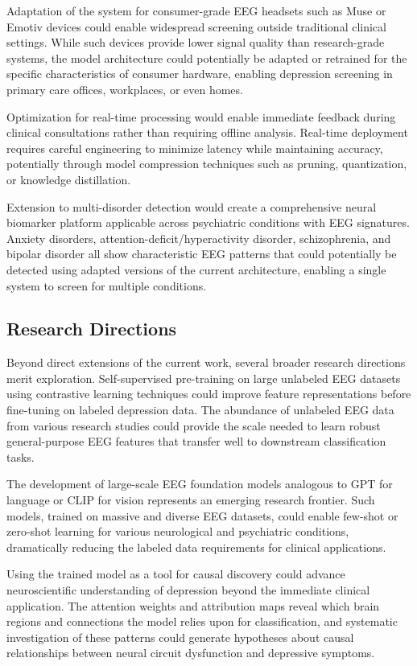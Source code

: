 Adaptation of the system for consumer-grade EEG headsets such as Muse or Emotiv devices could enable widespread screening outside traditional clinical settings. While such devices provide lower signal quality than research-grade systems, the model architecture could potentially be adapted or retrained for the specific characteristics of consumer hardware, enabling depression screening in primary care offices, workplaces, or even homes.

Optimization for real-time processing would enable immediate feedback during clinical consultations rather than requiring offline analysis. Real-time deployment requires careful engineering to minimize latency while maintaining accuracy, potentially through model compression techniques such as pruning, quantization, or knowledge distillation.

Extension to multi-disorder detection would create a comprehensive neural biomarker platform applicable across psychiatric conditions with EEG signatures. Anxiety disorders, attention-deficit/hyperactivity disorder, schizophrenia, and bipolar disorder all show characteristic EEG patterns that could potentially be detected using adapted versions of the current architecture, enabling a single system to screen for multiple conditions.

\subsection{Research Directions}

Beyond direct extensions of the current work, several broader research directions merit exploration. Self-supervised pre-training on large unlabeled EEG datasets using contrastive learning techniques could improve feature representations before fine-tuning on labeled depression data. The abundance of unlabeled EEG data from various research studies could provide the scale needed to learn robust general-purpose EEG features that transfer well to downstream classification tasks.

The development of large-scale EEG foundation models analogous to GPT for language or CLIP for vision represents an emerging research frontier. Such models, trained on massive and diverse EEG datasets, could enable few-shot or zero-shot learning for various neurological and psychiatric conditions, dramatically reducing the labeled data requirements for clinical applications.

Using the trained model as a tool for causal discovery could advance neuroscientific understanding of depression beyond the immediate clinical application. The attention weights and attribution maps reveal which brain regions and connections the model relies upon for classification, and systematic investigation of these patterns could generate hypotheses about causal relationships between neural circuit dysfunction and depressive symptoms.

